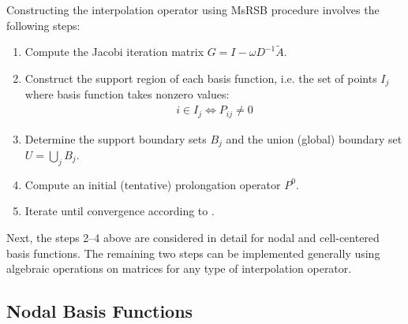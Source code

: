 Constructing the interpolation operator using MsRSB procedure involves the following steps:
\begin{enumerate}
    \item \label{itm:msrsb_step_matrix} Compute the Jacobi iteration matrix $G = I - \omega D^{-1} \tilde{A}$.
    \item \label{itm:msrsb_step_support} Construct the support region of each basis function, i.e. the set of points $I_j$ where basis function takes nonzero values:
    \begin{align}
        i \in I_j \iff P_{ij} \neq 0
    \end{align}
    \item \label{itm:msrsb_step_boundaries} Determine the support boundary sets $B_j$ and the union (global) boundary set $U = \bigcup\limits_{j} B_j$.
    \item \label{itm:msrsb_step_initp} Compute an initial (tentative) prolongation operator $P^0$.
    \item \label{itm:msrsb_step_iterate} Iterate until convergence according to .
\end{enumerate}
Next, the steps 2--4 above are considered in detail for nodal and cell-centered basis functions. The remaining two steps can be implemented generally using algebraic operations on matrices for any type of interpolation operator.

\subsection{Nodal Basis Functions}
\label{subsec:msrsb_nodal_basis}

